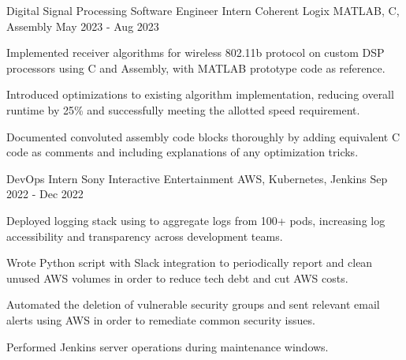 

\begin{cventries}

  \cventry
    {Digital Signal Processing Software Engineer Intern} %
    {Coherent Logix} %
    {MATLAB, C, Assembly} %
    {May 2023 - Aug 2023} %
    {
      \begin{cvitems} %
        \item {Implemented receiver algorithms for wireless 802.11b protocol on custom DSP processors using C and Assembly, with MATLAB prototype code as reference.}
        \item {Introduced optimizations to existing algorithm implementation, reducing overall runtime by 25\% and successfully meeting the allotted speed requirement.}
        \item {Documented convoluted assembly code blocks thoroughly by adding equivalent C code as comments and including explanations of any optimization tricks.}
      \end{cvitems}
    }

  \cventry
    {DevOps Intern} %
    {Sony Interactive Entertainment} %
    {AWS, Kubernetes, Jenkins} %
    {Sep 2022 - Dec 2022} %
    {
      \begin{cvitems} %
        \item {Deployed  logging stack using  to aggregate logs from 100+  pods, increasing log accessibility and transparency across development teams.}
        \item {Wrote Python script with Slack integration to periodically report and clean unused AWS volumes in order to reduce tech debt and cut AWS costs.}
        \item {Automated the deletion of vulnerable security groups and sent relevant email alerts using AWS  in order to remediate common security issues.}
        \item {Performed  Jenkins server operations during maintenance windows.}
      \end{cvitems}
    }


\end{cventries}
